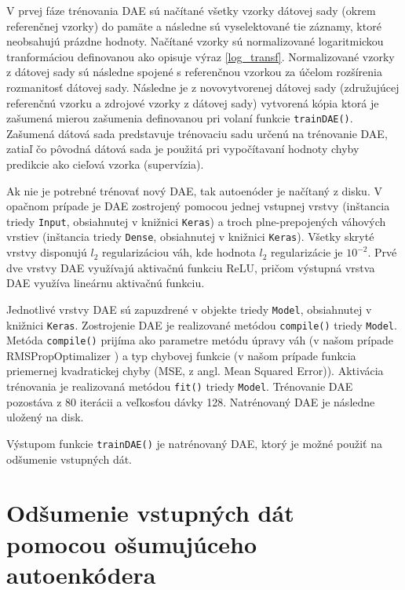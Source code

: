V prvej fáze trénovania DAE sú načítané všetky vzorky dátovej sady (okrem referenčnej vzorky) do pamäte a následne sú vyselektované tie záznamy, ktoré neobsahujú prázdne hodnoty. Načítané vzorky sú normalizované logaritmickou tranformáciou definovanou ako opisuje výraz \ref{log_transf}. Normalizované vzorky z dátovej sady sú následne spojené s referenčnou vzorkou za účelom rozšírenia rozmanitosť dátovej sady.  Následne je z novovytvorenej dátovej sady (združujúcej referenčnú vzorku a zdrojové vzorky z dátovej sady) vytvorená kópia ktorá je zašumená mierou zašumenia definovanou pri volaní funkcie \texttt{trainDAE()}. Zašumená dátová sada predstavuje trénovaciu sadu určenú na trénovanie DAE, zatiaľ čo pôvodná dátová sada je použitá pri vypočítavaní hodnoty chyby predikcie ako cieľová vzorka (supervízia).

Ak nie je potrebné trénovať nový DAE, tak autoenóder je načítaný z disku. V opačnom prípade je DAE zostrojený pomocou jednej vstupnej vrstvy (inštancia triedy \texttt{Input}, obsiahnutej v knižnici \texttt{Keras}) a troch plne-prepojených váhových vrstiev (inštancia triedy \texttt{Dense}, obsiahnutej v knižnici \texttt{Keras}). Všetky skryté vrstvy disponujú $l_2$ regularizáciou váh, kde hodnota $l_2$ regularizácie je $10^{-2}$. Prvé dve vrstvy DAE využívajú aktivačnú funkciu ReLU, pričom výstupná vrstva DAE využíva lineárnu aktivačnú funkciu.

Jednotlivé vrstvy DAE sú zapuzdrené v objekte triedy \texttt{Model}, obsiahnutej v knižnici \texttt{Keras}. Zostrojenie DAE je realizované metódou \texttt{compile()} triedy \texttt{Model}. Metóda \texttt{compile()} prijíma ako parametre metódu úpravy váh (v našom prípade RMSPropOptimalizer \cite{Goh1995}) a typ chybovej funkcie (v našom prípade funkcia priemernej kvadratickej chyby (MSE, z angl. Mean Squared Error)). Aktivácia trénovania je realizovaná metódou \texttt{fit()} triedy \texttt{Model}. Trénovanie DAE pozostáva z 80 iterácii a veľkosťou dávky 128. Natrénovaný DAE je následne uložený na disk.

Výstupom funkcie \texttt{trainDAE()} je natrénovaný DAE, ktorý je možné použiť na odšumenie vstupných dát.

\section{Odšumenie vstupných dát pomocou ošumujúceho autoenkódera}
\label{predict_DAE}

